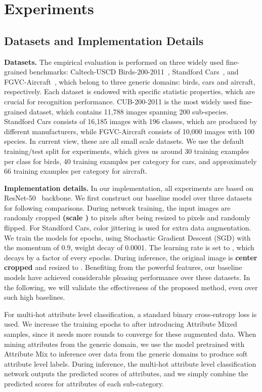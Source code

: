 \documentclass[runningheads]{llncs}
\begin{document}
\section{Experiments}

\subsection{Datasets and Implementation Details}
\textbf{Datasets.}
The empirical evaluation is performed on three widely used fine-grained benchmarks: Caltech-USCD Birds-200-2011~\cite{wah2011caltech}, Standford Cars~\cite{KrauseStarkDengFei-Fei_3DRR2013}, and FGVC-Aircraft~\cite{maji2013fine}, which belong to three generic domains: birds, cars and aircraft, respectively. Each dataset is endowed with specific statistic properties, which are crucial for recognition performance. CUB-200-2011 is the most widely used fine-grained dataset, which contains 11,788 images spanning 200 sub-species. Standford Cars consists of 16,185 images with 196 classes, which are produced by different manufacturers, while FGVC-Aircraft consists of 10,000 images with 100 species. In current view, these are all small scale datasets. We use the default training/test split for experiments, which gives us around 30 training examples per class for birds, 40 training examples per category for cars, and approximately 66 training examples per category for aircraft.

\textbf{Implementation details.}
In our implementation, all experiments are based on ResNet-50~\cite{he2016deep} backbone. We first construct our baseline model over three datasets for following comparisons.
During network training, the input images are randomly cropped \textbf{(scale )} to  pixels after being resized to  pixels and randomly flipped. For Standford Cars, color jittering is used for extra data augmentation. We train the models for  epochs, using Stochastic Gradient Descent (SGD) with the momentum of 0.9, weight decay of 0.0001.  The learning rate is set to , which decays by a factor of  every  epochs.   During inference, the original image is \textbf{center cropped} and resized to . Benefiting from the powerful features, our baseline models have achieved considerable pleasing performance over these datasets. In the following, we will validate the effectiveness of the proposed method, even over such high baselines. 

For multi-hot attribute level classification, a standard binary cross-entropy loss is used. We increase the training epochs to  after introducing Attribute Mixed samples, since it needs more rounds to converge for these augmented data. When mining attributes from the generic domain, we use the model pretrained with Attribute Mix to inference over data from the generic domains to produce soft attribute level labels. During inference, the multi-hot attribute level classification network outputs the predicted scores of  attributes, and we simply combine the predicted scores for  attributes of each sub-category.
\end{document}
